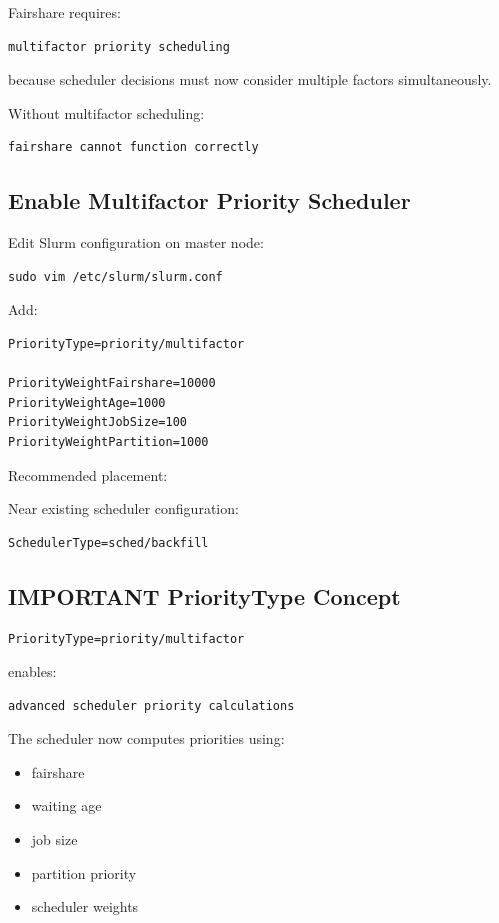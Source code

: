 \documentclass[11pt]{article}
\begin{document}
Fairshare requires:

\begin{verbatim}
multifactor priority scheduling
\end{verbatim}

because scheduler decisions must now consider multiple factors
simultaneously.

Without multifactor scheduling:

\begin{verbatim}
fairshare cannot function correctly
\end{verbatim}
\subsection{Enable Multifactor Priority Scheduler}
\label{sec:orgd18da30}

Edit Slurm configuration on master node:

\begin{verbatim}
sudo vim /etc/slurm/slurm.conf
\end{verbatim}

Add:

\begin{verbatim}
PriorityType=priority/multifactor

PriorityWeightFairshare=10000
PriorityWeightAge=1000
PriorityWeightJobSize=100
PriorityWeightPartition=1000
\end{verbatim}

Recommended placement:

Near existing scheduler configuration:

\begin{verbatim}
SchedulerType=sched/backfill
\end{verbatim}
\subsection{IMPORTANT PriorityType Concept}
\label{sec:orgc231050}

\begin{verbatim}
PriorityType=priority/multifactor
\end{verbatim}

enables:

\begin{verbatim}
advanced scheduler priority calculations
\end{verbatim}

The scheduler now computes priorities using:

\begin{itemize}
\item fairshare
\item waiting age
\item job size
\item partition priority
\item scheduler weights
\end{itemize}
\end{document}
